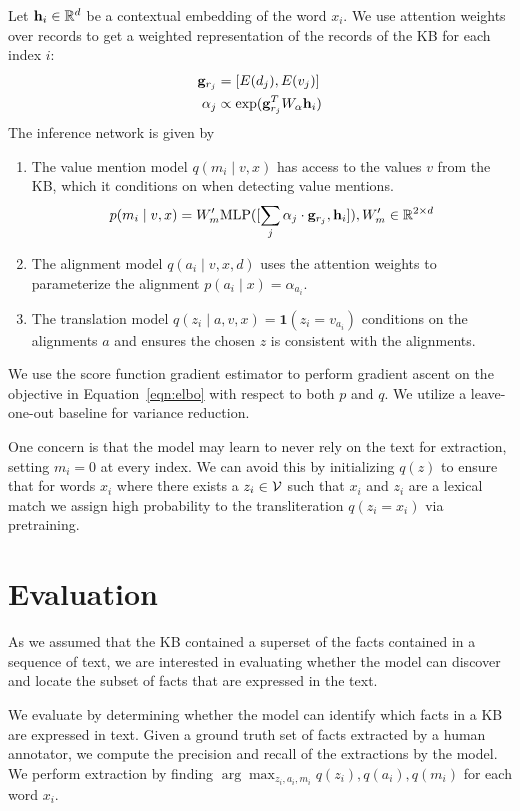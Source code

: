 \documentclass[12pt]{article}
\begin{document}
Let $\mathbf{h}_i \in \mathbb{R}^d$ be a contextual embedding of the word $x_i$.
We use attention weights over records to get a weighted representation
of the records of the KB for each index $i$:
\begin{align*}
\mathbf{g}_{r_j} &= [E(d_j), E(v_j)]\\
\alpha_j &\propto \exp(\mathbf{g}_{r_j}^T W_\alpha \mathbf{h}_i)
\end{align*}
The inference network is given by
\begin{enumerate}
\item The value mention model $q(m_i \mid v,x)$ 
    has access to the values $v$ from the KB, which it conditions on
    when detecting value mentions. 
    $$p(m_i \mid v,x) = W_m' \textrm{MLP}([\sum_j \alpha_j \cdot \mathbf{g}_{r_j}, \mathbf{h}_i]), W'_m \in \mathbb{R}^{2 \times d}$$
\item The alignment model $q(a_i \mid v,x,d)$
    uses the attention weights to parameterize the alignment
    $p(a_i \mid x) = \alpha_{a_i}$.
\item The translation model $q(z_i \mid a,v,x) = \mathbf{1}(z_i = v_{a_i})$
    conditions on the alignments $a$ and ensures the chosen $z$ is consistent
    with the alignments. 
\end{enumerate}

We use the score function gradient estimator to perform gradient ascent on the objective
in Equation~\ref{eqn:elbo} with respect to both $p$ and $q$.
We utilize a leave-one-out baseline for variance reduction.

One concern is that the model may learn to never rely on the text for extraction,
setting $m_i = 0$ at every index.
We can avoid this by initializing $q(z)$ to ensure that for words $x_i$
where there exists a $z_i \in \mathcal{V}$ such that $x_i$ and $z_i$ are a lexical match
we assign high probability to the transliteration $q(z_i = x_i)$
via pretraining.

\section{Evaluation}
As we assumed that the KB contained a superset of the facts contained in
a sequence of text, we are interested in evaluating whether the model can discover
and locate the subset of facts that are expressed in the text.

We evaluate by determining whether the model can identify which facts in a KB
are expressed in text.
Given a ground truth set of facts extracted by a human annotator,
we compute the precision and recall of the extractions by the model.
We perform extraction by finding $\arg\max_{z_i,a_i,m_i}q(z_i),q(a_i),q(m_i)$
for each word $x_i$.
\end{document}
